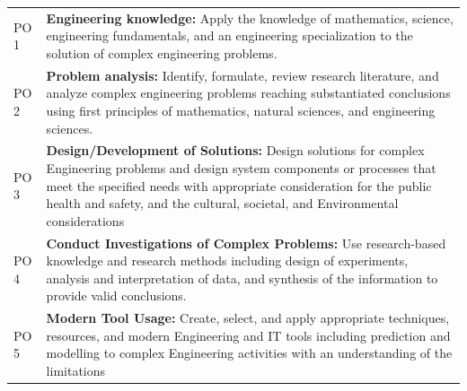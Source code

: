 \documentclass[11pt]{exam}
\begin{document}
\begin{flushleft}
	\begin{longtable}{|>{\centering\arraybackslash}p{1.6cm}  | >{\raggedright\arraybackslash}p{14cm}  | }
		\hline
		\multicolumn{2}{|c|}{\textbf{Program Outcomes}}  \\ \hline
		\endhead
		\hline
		PO 1&	\textbf{Engineering knowledge:} Apply the knowledge of mathematics, science, engineering fundamentals, and an engineering specialization to the solution of complex engineering problems.\\ \hline
		PO 2&	\textbf{Problem analysis:} Identify, formulate, review research literature, and analyze complex engineering problems reaching substantiated conclusions using first principles of mathematics, natural sciences, and engineering sciences.\\ \hline
		PO 3&	\textbf{Design/Development of Solutions:} Design solutions for complex Engineering problems and design system components or processes that meet the specified needs with  appropriate consideration for the public health and safety,
		and the cultural, societal, and Environmental considerations\\ \hline
		PO 4&	\textbf{Conduct Investigations of Complex Problems:} Use research-based knowledge and research methods including design of experiments, analysis and interpretation of data, and synthesis of the information to provide valid conclusions.\\ \hline
		PO 5&	\textbf{Modern Tool Usage: }Create, select, and apply appropriate techniques, resources, and modern Engineering and IT tools including prediction and modelling to complex Engineering activities with an understanding of the limitations\\ \hline
		

\end{longtable}
\end{flushleft}
\end{document}
